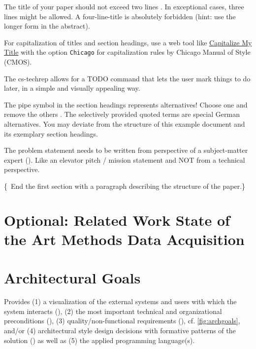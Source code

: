 \documentclass[conference,a4paper,flushend]{cs-techrep} %
\begin{document}
The title of your paper should not exceed two lines \faWarning{}. In exceptional cases, three lines might be allowed. A four-line-title is absolutely forbidden (hint: use the longer form in the abstract).

For capitalization of titles and section headings, use a web tool like \href{https://capitalizemytitle.com/style/Chicago/}{Capitalize My Title} \faWarning{} with the option \texttt{Chicago} for capitalization rules by Chicago Manual of Style (CMOS).

The cs-techrep allows for a TODO command that lets the user mark things to do later, in a simple and visually appealing way.

The pipe symbol \textquote{\textbar{}} in the section headings represents alternatives! Choose one and remove the others \faWarning{}. The selectively provided quoted terms are special German alternatives. You may deviate from the structure of this example document and its exemplary section headings.

The problem statement needs to be written from perspective of a subject-matter expert (). Like an elevator pitch / mission statement \faWarning{} and NOT from a technical perspective.

\{\,\faWarning{} End the first section with a paragraph describing the structure of the paper.\}

\section{Optional: Related Work \textbar{} State of the Art \textbar{} Methods \textbar{} Data Acquisition}
\lipsum[2]

\section{Architectural Goals} %
Provides
(1) a visualization of the external systems and users with which the system interacts (),
(2) the most important technical and organizational preconditions (),
(3) quality/non-functional requirements (), cf. \cref{fig:archgoals}, and/or
(4) architectural style design decisions with formative patterns of the solution ()
as well as (5) the applied programming language(s).
\end{document}
